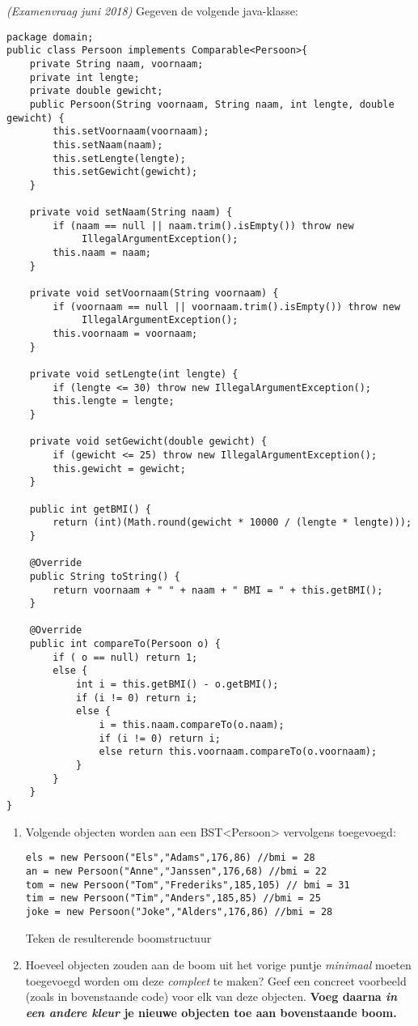 \newpage
\begin{oef}
\papier \emph{(Examenvraag juni 2018)} Gegeven de volgende java-klasse:
\begin{lstlisting}
package domain;
public class Persoon implements Comparable<Persoon>{
	private String naam, voornaam;
	private int lengte;
	private double gewicht;
	public Persoon(String voornaam, String naam, int lengte, double gewicht) {
		this.setVoornaam(voornaam);
		this.setNaam(naam);
		this.setLengte(lengte);
		this.setGewicht(gewicht);
	}

	private void setNaam(String naam) {
		if (naam == null || naam.trim().isEmpty()) throw new
			 IllegalArgumentException();
		this.naam = naam;
	}

	private void setVoornaam(String voornaam) {
		if (voornaam == null || voornaam.trim().isEmpty()) throw new
			 IllegalArgumentException();
		this.voornaam = voornaam;
	}

	private void setLengte(int lengte) {
		if (lengte <= 30) throw new IllegalArgumentException();
		this.lengte = lengte;
	}

	private void setGewicht(double gewicht) {
		if (gewicht <= 25) throw new IllegalArgumentException();
		this.gewicht = gewicht;
	}
	
	public int getBMI() {
		return (int)(Math.round(gewicht * 10000 / (lengte * lengte)));
	}
	
	@Override
	public String toString() {
		return voornaam + " " + naam + " BMI = " + this.getBMI();
	}

	@Override
	public int compareTo(Persoon o) {
		if ( o == null) return 1;
		else {
			int i = this.getBMI() - o.getBMI();
			if (i != 0) return i;
			else {
				i = this.naam.compareTo(o.naam);
				if (i != 0) return i;
				else return this.voornaam.compareTo(o.voornaam);
			}
		}
	}
}
\end{lstlisting}
\begin{enumerate}
\item Volgende objecten worden aan een BST<Persoon> vervolgens toegevoegd:
\begin{verbatim}
els = new Persoon("Els","Adams",176,86) //bmi = 28	
an = new Persoon("Anne","Janssen",176,68) //bmi = 22
tom = new Persoon("Tom","Frederiks",185,105) // bmi = 31
tim = new Persoon("Tim","Anders",185,85) //bmi = 25
joke = new Persoon("Joke","Alders",176,86) //bmi = 28
\end{verbatim}
Teken de resulterende boomstructuur

\item  Hoeveel objecten zouden aan de boom uit het vorige puntje \emph{minimaal} moeten toegevoegd worden om deze \emph{compleet} te maken? Geef een concreet voorbeeld (zoals in bovenstaande code) voor elk van deze objecten.  \textbf{Voeg daarna \emph{in een andere kleur} je nieuwe objecten toe aan bovenstaande boom.}


\end{enumerate}
\end{oef}
